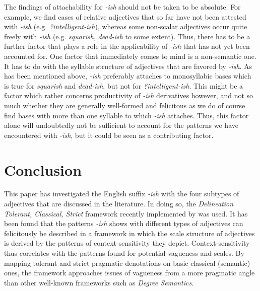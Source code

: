 \documentclass[output=paper
,modfonts
,nonflat]{langsci/langscibook}
\begin{document}
The findings of attachability for \textit{-ish} should not be taken to be absolute. For example, we find cases of relative adjectives that so far have not been attested with \textit{-ish} (e.g. \textit{?intelligent-ish}), whereas some non-scalar adjectives occur quite freely with \textit{-ish} (e.g. \textit{squarish}, \textit{dead-ish} to some extent). Thus, there has to be a further factor that plays a role in the applicability of \textit{-ish} that has not yet been accounted for. One factor that immediately comes to mind is a non-semantic one. It has to do with the syllable structure of adjectives that are favored by \textit{-ish}. As has been mentioned above, \textit{-ish} preferably attaches to monosyllabic bases which is true for \textit{squarish} and \textit{dead-ish}, but not for \textit{?intelligent-ish}. This might be a factor which rather concerns productivity of \textit{-ish} derivatives however, and not so much whether they are generally well-formed and felicitous as we do of course find bases with more than one syllable to which \textit{-ish} attaches. Thus, this factor alone will undoubtedly not be sufficient to account for the patterns we have encountered with \textit{-ish}, but it could be seen as a contributing factor.

\section{Conclusion}
\label{sec:summary}

This paper has investigated the English suffix \textit{-ish} with the four subtypes of adjectives that are discussed in the literature. In doing so, the \textit{Delineation Tolerant, Classical, Strict} framework recently implemented by \citet{Burnett2017} was used. It has been found that the patterns \textit{-ish} shows with different types of adjectives can felicitously be described in a framework in which the scale structure of adjectives is derived by the patterns of context-sensitivity they depict. Context-sensitivity thus correlates with the patterns found for potential vagueness and scales. By mapping tolerant and strict pragmatic denotations on basic classical (semantic) ones, the framework approaches issues of vagueness from a more pragmatic angle than other well-known frameworks such as \textit{Degree Semantics}.
\end{document}
